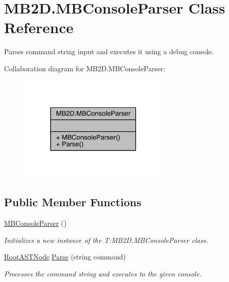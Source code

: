 \hypertarget{class_m_b2_d_1_1_m_b_console_parser}{}\section{M\+B2\+D.\+M\+B\+Console\+Parser Class Reference}
\label{class_m_b2_d_1_1_m_b_console_parser}


Parses command string input and executes it using a debug console.  




Collaboration diagram for M\+B2\+D.\+M\+B\+Console\+Parser\+:\nopagebreak
\begin{figure}[H]
\begin{center}
\leavevmode
\includegraphics[width=208pt]{class_m_b2_d_1_1_m_b_console_parser__coll__graph}
\end{center}
\end{figure}
\subsection*{Public Member Functions}
\begin{DoxyCompactItemize}
\item 
\hyperlink{class_m_b2_d_1_1_m_b_console_parser_ad14d20f3d88fade887577eb105837008}{M\+B\+Console\+Parser} ()
\begin{DoxyCompactList}\small\item\em Initializes a new instance of the T\+:\+M\+B2\+D.\+M\+B\+Console\+Parser class. \end{DoxyCompactList}\item 
\hyperlink{class_m_b2_d_1_1_root_a_s_t_node}{Root\+A\+S\+T\+Node} \hyperlink{class_m_b2_d_1_1_m_b_console_parser_a880d5a9c56db05d19610df482b15bbf0}{Parse} (string command)
\begin{DoxyCompactList}\small\item\em Processes the command string and executes to the given console. \end{DoxyCompactList}\end{DoxyCompactItemize}


